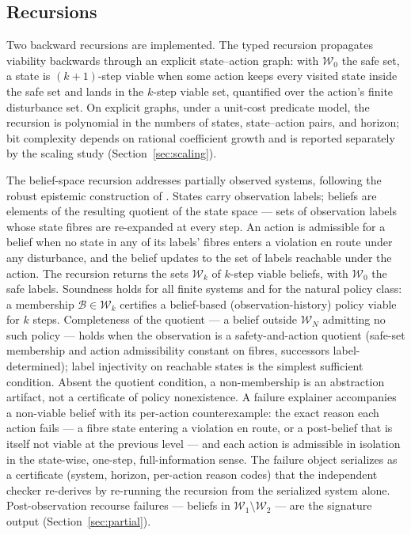 \documentclass[3p,11pt]{elsarticle}
\begin{document}
\subsection{Recursions}\label{sec:recursions}

Two backward recursions are implemented. The typed recursion propagates
viability backwards through an explicit state--action graph: with
$\mathcal{W}_0$ the safe set, a state is $(k{+}1)$-step viable when some
action keeps every visited state inside the safe set and lands in the
$k$-step viable set, quantified over the action's finite disturbance set.
On explicit graphs, under a unit-cost predicate model, the recursion is
polynomial in the numbers of states, state--action pairs, and horizon;
bit complexity depends on rational coefficient growth and is reported
separately by the scaling study (Section~\ref{sec:scaling}).

The belief-space recursion addresses partially observed systems,
following the robust epistemic construction of \citet{Abaee2026b}. States
carry observation labels; beliefs are elements of the resulting quotient
of the state space --- sets of observation labels whose state fibres are
re-expanded at every step. An action is admissible for a belief when no
state in any of its labels' fibres enters a violation en route under any
disturbance, and the belief updates to the set of labels reachable under
the action. The recursion returns the sets $\mathcal{W}_k$ of $k$-step
viable beliefs, with $\mathcal{W}_0$ the safe labels. Soundness holds for
all finite systems and for the natural policy class: a membership
$\mathcal{B} \in \mathcal{W}_k$ certifies a belief-based
(observation-history) policy viable for $k$ steps. Completeness of the
quotient --- a belief outside $\mathcal{W}_N$ admitting no such policy ---
holds when the observation is a safety-and-action quotient (safe-set
membership and action admissibility constant on fibres, successors
label-determined); label injectivity on reachable states is the simplest
sufficient condition. Absent the quotient condition, a non-membership is
an abstraction artifact, not a certificate of policy nonexistence. A
failure explainer accompanies a non-viable belief with its per-action
counterexample: the exact reason each action fails --- a fibre state
entering a violation en route, or a post-belief that is itself not viable
at the previous level --- and each action is admissible in isolation in
the state-wise, one-step, full-information sense. The failure object
serializes as a certificate (system, horizon, per-action reason codes)
that the independent checker re-derives by re-running the recursion from
the serialized system alone. Post-observation recourse failures ---
beliefs in $\mathcal{W}_1 \setminus \mathcal{W}_2$ --- are the signature
output (Section~\ref{sec:partial}).
\end{document}
